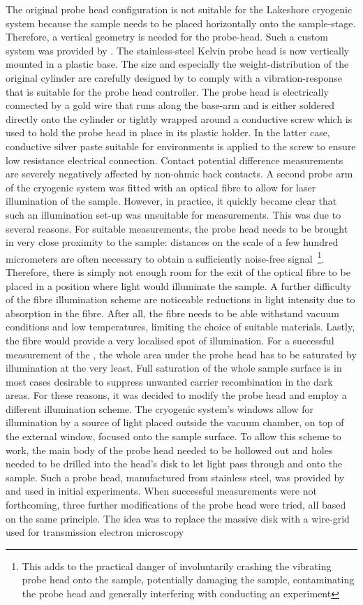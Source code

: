 The original probe head configuration is not suitable for the Lakeshore cryogenic system because the sample needs to be placed horizontally onto the sample-stage. Therefore, a vertical geometry is needed for the probe-head. Such a custom system was provided by \McA{}. The stainless-steel Kelvin probe head is now vertically mounted in a plastic base. The size and especially the weight-distribution of the original cylinder are carefully designed by \McA{} to comply with a vibration-response that is suitable for the probe head controller. The probe head is electrically connected by a gold wire that runs along the base-arm and is either soldered directly onto the cylinder or tightly wrapped around a conductive screw which is used to hold the probe head in place in its plastic holder. In the latter case, conductive silver paste suitable for \uhv{} environments is applied to the screw to ensure low resistance electrical connection. Contact potential difference measurements are severely negatively affected by non-ohmic back contacts. A second probe arm of the cryogenic system was fitted with an optical fibre to allow for laser illumination of the sample. However, in practice, it quickly became clear that such an illumination set-up was unsuitable for \spv{} measurements. This was due to several reasons. For suitable \cpd{} measurements, the probe head needs to be brought in very close proximity to the sample: distances on the scale of a few hundred micrometers are often necessary to obtain a sufficiently noise-free signal~\footnote{This adds to the practical danger of involuntarily crashing the vibrating probe head onto the sample, potentially damaging the sample, contaminating the probe head and generally interfering with conducting an experiment}. Therefore, there is simply not enough room for the exit of the optical fibre to be placed in a position where light would illuminate the sample. A further difficulty of the fibre illumination scheme are noticeable reductions in light intensity due to absorption in the fibre. After all, the fibre needs to be able withstand vacuum conditions and low temperatures, limiting the choice of suitable materials. Lastly, the fibre would provide a very localised spot of illumination. For a successful measurement of the \spv{}, the whole area under the probe head has to be saturated by illumination at the very least. Full saturation of the whole sample surface is in most cases desirable to suppress unwanted carrier recombination in the dark areas. For these reasons, it was decided to modify the probe head and employ a different illumination scheme. The cryogenic system's windows allow for illumination by a source of light placed outside the vacuum chamber, on top of the external window, focused onto the sample surface. To allow this scheme to work, the main body of the probe head needed to be hollowed out and holes needed to be drilled into the head's disk to let light pass through and onto the sample. Such a probe head, manufactured from stainless steel, was provided by \McA{} and used in initial experiments. When successful measurements were not forthcoming, three further modifications of the probe head were tried, all based on the same principle. The idea was to replace the massive disk with a wire-grid used for transmission electron microscopy 